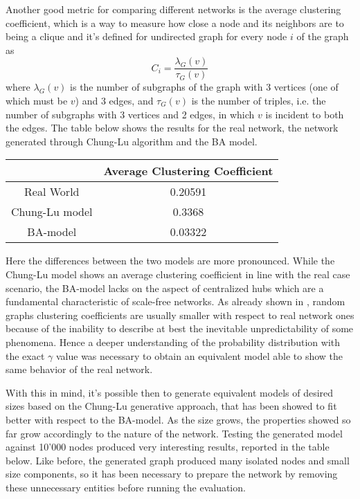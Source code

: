 	Another good metric for comparing different networks is the average clustering coefficient, which is a way to measure how close a node and its neighbors are to being a clique and it's defined for undirected graph for every node $i$ of the graph as $$C_i = \frac{\lambda_G(v)}{\tau_G(v)}$$ where $\lambda_G(v)$ is the number of subgraphs of the graph with 3 vertices (one of which must be $v$) and 3 edges, and $\tau_G(v)$ is the number of triples, i.e. the number of subgraphs with 3 vertices and 2 edges, in which $v$ is incident to both the edges. The table below shows the results for the real network, the network generated through Chung-Lu algorithm and the BA model.
	\begin{center}
		\begin{tabulary}{0.75\linewidth}{| C | C |}
			\hline
			& Average Clustering Coefficient \\ \hline
			Real World & 0.20591 \\ \hline
			Chung-Lu model & 0.3368 \\ \hline
			BA-model & 0.03322 \\
			\hline
		\end{tabulary}
	\end{center} 
	Here the differences between the two models are more pronounced. While the Chung-Lu model shows an average clustering coefficient in line with the real case scenario, the BA-model lacks on the aspect of centralized hubs which are a fundamental characteristic of scale-free networks. As already shown in \cite{Watts1998}, random graphs clustering coefficients are usually smaller with respect to real network ones because of the inability to describe at best the inevitable unpredictability of some phenomena. Hence a deeper understanding of the probability distribution with the exact $\gamma$ value was necessary to obtain an equivalent model able to show the same behavior of the real network.
	
	With this in mind, it's possible then to generate equivalent models of desired sizes based on the Chung-Lu generative approach, that has been showed to fit better with respect to the BA-model. As the size grows, the properties showed so far grow accordingly to the nature of the network. Testing the generated model against 10'000 nodes produced very interesting results, reported in the table below. Like before, the generated graph produced many isolated nodes and small size components, so it has been necessary to prepare the network  by removing these unnecessary entities before running the evaluation.
	
